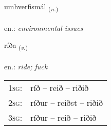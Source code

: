 \documentclass[frontgrid, backgrid]{flacards}\usepackage[]{graphicx}\usepackage[]{xcolor}
\begin{document}
\renewcommand{\flhead}{\vskip5pt \fboxsep=0pt {\small\bfseries\footnotesize Nafnorð | Noun}}
\renewcommand{\fcfoot}{\vskip5pt \fboxsep=0pt \hspace{2pt}{\small\bfseries\footnotesize 2K}}

\renewcommand{\blhead}{\vskip5pt {\small\bfseries\footnotesize Nafnorð | Noun }}
\renewcommand{\bcfoot}{\vskip5pt \hspace{2pt}{\small\bfseries\footnotesize 2K}}


{umhverfismál \small{\textsubscript{(\textit{n.})}} \\[1ex] %
\textphonetic{[ʏmkʰvɛrvɪsmaul]} \\
en.: \emph{environmental issues} \\  [2ex]
\renewcommand*{\arraystretch}{0.8}
}

\renewcommand{\flhead}{\vskip5pt \fboxsep=0pt {\small\bfseries\footnotesize Sagnorð | Verb}}
\renewcommand{\fcfoot}{\vskip5pt \fboxsep=0pt \hspace{2pt}{\small\bfseries\footnotesize 2K}}

\renewcommand{\blhead}{\vskip5pt {\small\bfseries\footnotesize Sagnorð | Verb }}
\renewcommand{\bcfoot}{\vskip5pt \hspace{2pt}{\small\bfseries\footnotesize 2K}}


{ríða \small{\textsubscript{(\textit{v.})}} \\[1ex] %
\textphonetic{[riːða]} \\
en.: \emph{ride; fuck} \\  [2ex]
\renewcommand*{\arraystretch}{0.8}
\begin{tabular}{p{1cm}l}
\textsc{1sg}: & ríð -- reið -- riðið \\ 
\textsc{2sg}: & ríður -- reiðst -- riðið \\ 
\textsc{3sg}: & ríður -- reið -- riðið \\ 
\end{tabular}
}
\end{document}
